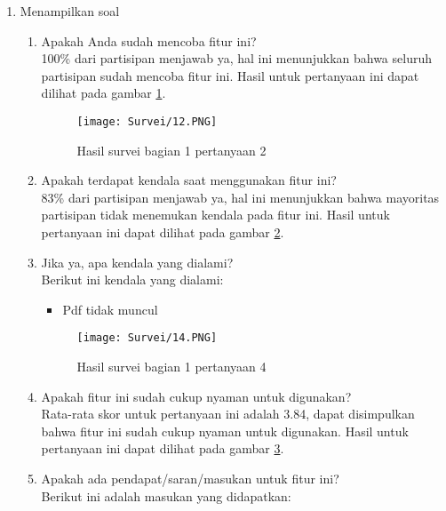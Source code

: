 \begin{enumerate}
    \item Menampilkan soal
    \begin{enumerate}
        \begin{figure}[H]
        	\centering  
        	\texttt{[image: Survei/11.PNG]}  
        	\caption{Hasil survei bagian 1 pertanyaan 1}
        	\label{fig:5:survei11} 
        \end{figure} 
        \item Apakah Anda sudah mencoba fitur ini? \\ 100\% dari partisipan menjawab ya, hal ini menunjukkan bahwa seluruh partisipan sudah mencoba fitur ini. Hasil untuk pertanyaan ini dapat dilihat pada gambar \ref{fig:5:survei11}.
        \begin{figure}[H]
        	\centering  
        	\texttt{[image: Survei/12.PNG]}  
        	\caption{Hasil survei bagian 1 pertanyaan 2}
        	\label{fig:5:survei12} 
        \end{figure} 
        \item Apakah terdapat kendala saat menggunakan fitur ini? \\ 83\% dari partisipan menjawab ya, hal ini menunjukkan bahwa mayoritas partisipan tidak menemukan kendala pada fitur ini. Hasil untuk pertanyaan ini dapat dilihat pada gambar \ref{fig:5:survei12}.
        \item Jika ya, apa kendala yang dialami? \\ Berikut ini kendala yang dialami:
        \begin{itemize}
            \item Pdf tidak muncul
        \end{itemize}
        \begin{figure}[H]
        	\centering  
        	\texttt{[image: Survei/14.PNG]}  
        	\caption{Hasil survei bagian 1 pertanyaan 4}
        	\label{fig:5:survei14} 
        \end{figure}
        \item Apakah fitur ini sudah cukup nyaman untuk digunakan? \\ Rata-rata skor untuk pertanyaan ini adalah 3.84, dapat disimpulkan bahwa fitur ini sudah cukup nyaman untuk digunakan. Hasil untuk pertanyaan ini dapat dilihat pada gambar \ref{fig:5:survei14}.
        \item Apakah ada pendapat/saran/masukan untuk fitur ini? \\ Berikut ini adalah masukan yang didapatkan:

\end{enumerate}
\end{enumerate}
